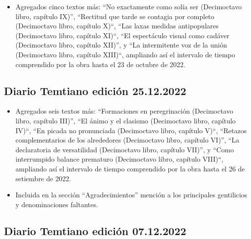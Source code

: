 \documentclass[
]{book}
\providecommand{\tightlist}{%
  \setlength{\itemsep}{0pt}\setlength{\parskip}{0pt}}
\begin{document}
\begin{itemize}
\tightlist
\item
  Agregados cinco textos más: ``No exactamente como solía ser (Decimoctavo libro, capítulo IX)'', ``Rectitud que tarde se contagia por completo (Decimoctavo libro, capítulo X)``, ``Las laxas medidas antipopulares (Decimoctavo libro, capítulo XI)``, ``El espectáculo visual como cadáver (Decimoctavo libro, capítulo XII)'', y ``La intermitente voz de la unión (Decimoctavo libro, capítulo XIII)``, ampliando así el intervalo de tiempo comprendido por la obra hasta el 23 de octubre de 2022.
\end{itemize}

\hypertarget{diario-temtiano-ediciuxf3n-25.12.2022}{%
\subsection*{Diario Temtiano edición 25.12.2022}\label{diario-temtiano-ediciuxf3n-25.12.2022}}

\begin{itemize}
\item
  Agregados seis textos más: ``Formaciones en peregrinación (Decimoctavo libro, capítulo III)'', ``El ánimo y el clasismo (Decimoctavo libro, capítulo IV)``, ``En picada no pronunciada (Decimoctavo libro, capítulo V)``, ``Retazos complementarios de los alrededores (Decimoctavo libro, capítulo VI)'', ``La declaratoria de versatilidad (Decimoctavo libro, capítulo VII)'', y ``Como interrumpido balance prematuro (Decimoctavo libro, capítulo VIII)``, ampliando así el intervalo de tiempo comprendido por la obra hasta el 26 de setiembre de 2022.
\item
  Incluida en la sección ``Agradecimientos'' mención a los principales gentilicios y denominaciones faltantes.
\end{itemize}

\hypertarget{diario-temtiano-ediciuxf3n-07.12.2022}{%
\subsection*{Diario Temtiano edición 07.12.2022}\label{diario-temtiano-ediciuxf3n-07.12.2022}}
\end{document}
